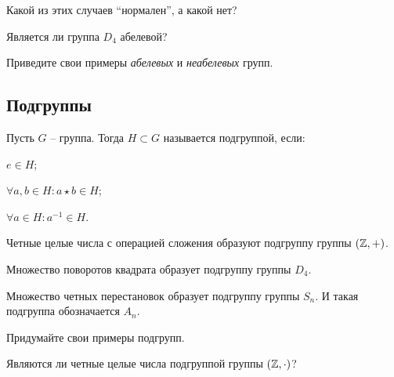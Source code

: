 \begin{practice}
   Какой из этих случаев ``нормален'', а какой нет? 
\end{practice}

\begin{practice}
    Является ли группа $D_4$ абелевой?
\end{practice}

\begin{practice}
    Приведите свои примеры \emph{абелевых} и \emph{неабелевых} групп. 
\end{practice}

\subsection{Подгруппы}
\begin{definition}
    [Подгруппа]
    Пусть $G$ -- группа. Тогда $H \subset G$ называется подгруппой, если:
    \begin{conditions}
    \item $e \in H$;
    \item $\forall a, b \in H: a \star b \in H$;
    \item $\forall a \in H: a^{-1} \in H$.
    \end{conditions}
\end{definition}

\begin{example}
    Четные целые числа с операцией сложения образуют подгруппу группы $(\mathbb Z, +)$.
\end{example}
\begin{example}
    Множество поворотов квадрата образует подгруппу группы $D_4$.
\end{example}
\begin{example}
    Множество четных перестановок образует подгруппу группы $S_n$. 
    И такая подгруппа обозначается $A_n$.
\end{example}
\begin{practice}
    Придумайте свои примеры подгрупп.
\end{practice}
\begin{practice}
    Являются ли четные целые числа подгруппой группы $(\mathbb Z, \cdot)$?
\end{practice}

